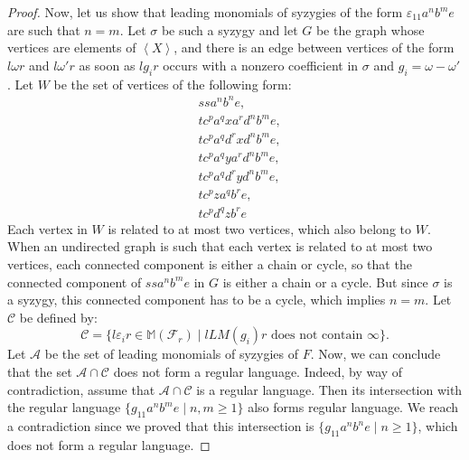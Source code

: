 \documentclass[sigconf]{acmart}
\theoremstyle{plain}
\theoremstyle{definition}
\theoremstyle{remark}
\newcommand{\MM}{\mathbb M}
\newcommand{\LM}{LM}
\begin{document}
\begin{proof}
  Now, let us show that leading monomials of syzygies of the form $\varepsilon_{11}a^nb^me$ are such that $n = m$.
  Let $\sigma$ be such a syzygy and let $G$ be the graph whose vertices are elements of $\left\langle X \right\rangle$, and there is an edge between vertices of the form $l\omega r$ and $l\omega'r$ as soon as $lg_ir$ occurs with a nonzero coefficient in $\sigma$ and $g_i=\omega - \omega'$. Let $W$ be the set of vertices of the following form:
  \begin{align*}
    & ssa^nb^ne, \\
    & tc^pa^qxa^rd^nb^me, \\
    & tc^pa^qd^rxd^nb^me, \\
    & tc^pa^qya^rd^nb^me, \\
    & tc^pa^qd^ryd^nb^me, \\
    & tc^pza^qb^re, \\
    & tc^pd^qzb^re
  \end{align*}
  Each vertex in $W$ is related to at most two vertices, which also belong to $W$. When an undirected graph is such that each vertex is related to at most two vertices, each connected component is either a chain or cycle, so that the connected component of $ssa^nb^me$ in $G$ is either a chain or a cycle.
  But since $\sigma$ is a syzygy, this connected component has to be a cycle, which implies $n = m$.
  Let $\mathscr{C}$ be defined by:
$$\mathscr{C}=\{l\varepsilon_ir \in \MM(\mathscr{F}_r) \;|\; l \LM(g_i) r \mbox{ does not contain } \infty\}.$$
   Let $\mathscr{A}$ be the set of leading monomials of syzygies of $F$.
   Now, we can conclude that the set $\mathscr{A} \cap \mathscr{C}$ does not form a regular language.
  Indeed, by way of contradiction, assume that $\mathscr{A}\cap \mathscr{C}$ is a regular language. Then its
  intersection with the regular language $\{g_{11}a^nb^me \;|\; n, m \geq 1\}$ also forms regular language.
  We reach a contradiction since we proved that this intersection is $\{g_{11}a^nb^ne \;|\; n \geq 1 \}$, which does not form a regular language.
\end{proof}
\end{document}

